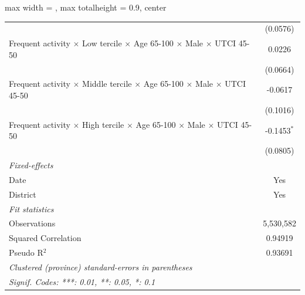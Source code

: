 \begin{table}[htbp]
\begin{adjustbox}{max width = \textwidth, max totalheight = 0.9\textheight, center}
\begin{tabular}{lc}
                                                                                                               & (0.0576)\\   
         Frequent activity $\times$ Low tercile $\times$ Age 65-100 $\times$ Male $\times$ UTCI 45-50          & 0.0226\\   
                                                                                                               & (0.0664)\\   
         Frequent activity $\times$ Middle tercile $\times$ Age 65-100 $\times$ Male $\times$ UTCI 45-50       & -0.0617\\   
                                                                                                               & (0.1016)\\   
         Frequent activity $\times$ High tercile $\times$ Age 65-100 $\times$ Male $\times$ UTCI 45-50         & -0.1453$^{*}$\\   
                                                                                                               & (0.0805)\\   
         \midrule
         \emph{Fixed-effects}\\
         Date                                                                                                  & Yes\\  
         District                                                                                              & Yes\\  
         \midrule
         \emph{Fit statistics}\\
         Observations                                                                                          & 5,530,582\\  
         Squared Correlation                                                                                   & 0.94919\\  
         Pseudo R$^2$                                                                                          & 0.93691\\  
         \midrule \midrule
         \multicolumn{2}{l}{\emph{Clustered (province) standard-errors in parentheses}}\\
         \multicolumn{2}{l}{\emph{Signif. Codes: ***: 0.01, **: 0.05, *: 0.1}}\\
      \end{tabular}
   \end{adjustbox}
\end{table}


